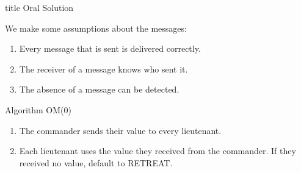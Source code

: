 \documentclass{beamer}
\theoremstyle{conjecture1}
\theoremstyle{conjecture2}
\begin{document}
\begin{frame}[t]
    \vfill
    \centering
    \begin{beamercolorbox}[sep=8pt,center,shadow=true,rounded=true]{title}
        Oral Solution\par%
    \end{beamercolorbox}
\end{frame}

\begin{frame}
    We make some assumptions about the messages:
    \begin{enumerate}[label={A\arabic{enumi}.}]
        \item<2-> Every message that is sent is delivered correctly.
        \item<3-> The receiver of a message knows who sent it.
        \item<4> The absence of a message can be detected.
    \end{enumerate}
\end{frame}

\begin{frame}
    \begin{block}{Algorithm OM(0)}
        \begin{enumerate}[label=\arabic{enumi}.]
            \item<2-> The commander sends their value to every lieutenant.
            \item<3> {
                Each lieutenant uses the value they received from the commander. If they received no value, 
                default to RETREAT.
            }
        \end{enumerate}
    \end{block}
\end{frame}
\end{document}
